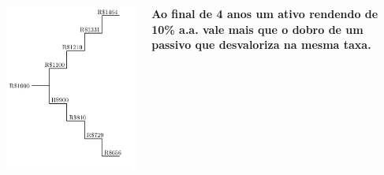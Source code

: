 \begin{frame}[c]
  \frametitle{}
  \begin{columns}
    \begin{column}{0.5\textwidth}
      \includegraphics[width=\textwidth]{../figuras/dobra4.pdf}
    \end{column}
    \begin{column}{0.5\textwidth}
      \centering
      \textbf{\large Ao final de 4 anos um ativo rendendo de 10\% a.a. vale mais que o dobro de um passivo que desvaloriza na mesma taxa.}
    \end{column}
  \end{columns}
\end{frame}